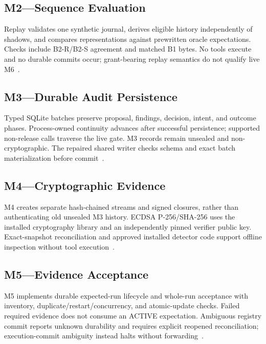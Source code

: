 \documentclass[conference]{IEEEtran}
\begin{document}
\subsection{M2---Sequence Evaluation}
Replay validates one synthetic journal, derives eligible history independently of shadows, and compares representations against prewritten oracle expectations. Checks include B2-R/B2-S agreement and matched B1 bytes. No tools execute and no durable commits occur; grant-bearing replay semantics do not qualify live M6~\cite{cgresults,cgprotocol}.

\subsection{M3---Durable Audit Persistence}
Typed SQLite batches preserve proposal, findings, decision, intent, and outcome phases. Process-owned continuity advances after successful persistence; supported non-release calls traverse the live gate. M3 records remain unsealed and non-cryptographic. The repaired shared writer checks schema and exact batch materialization before commit~\cite{cgresults}.

\subsection{M4---Cryptographic Evidence}
M4 creates separate hash-chained streams and signed closures, rather than authenticating old unsealed M3 history. ECDSA P-256/SHA-256 uses the installed cryptography library and an independently pinned verifier public key. Exact-snapshot reconciliation and approved installed detector code support offline inspection without tool execution~\cite{cgresults,cglock}.

\subsection{M5---Evidence Acceptance}
M5 implements durable expected-run lifecycle and whole-run acceptance with inventory, duplicate/restart/concurrency, and atomic-update checks. Failed required evidence does not consume an ACTIVE expectation. Ambiguous registry commit reports unknown durability and requires explicit reopened reconciliation; execution-commit ambiguity instead halts without forwarding~\cite{cgresults}.
\end{document}
